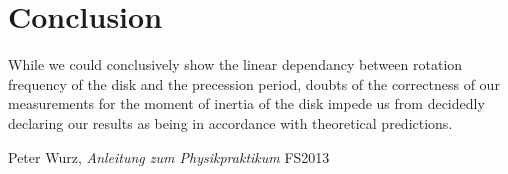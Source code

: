 \documentclass{scrreprt}
\begin{document}
\section{Conclusion}
While we could conclusively show the linear dependancy between rotation frequency of the disk and the precession period, doubts of the correctness of our measurements for the moment of inertia of the disk impede us from decidedly declaring our results as being in accordance with theoretical predictions.

\begin{thebibliography}{9}

  Peter Wurz,
  \emph{Anleitung zum Physikpraktikum}
  FS2013

\end{thebibliography}
\end{document}
